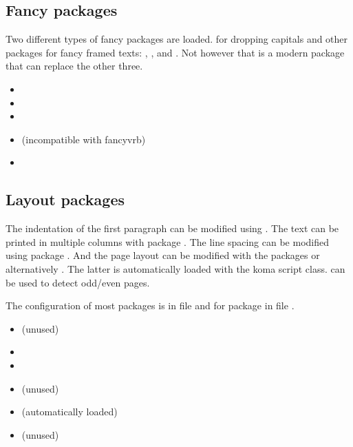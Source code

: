 \subsection{Fancy packages}
\label{sec:packages:fancy}

Two different types of fancy packages are loaded.  for dropping capitals and other packages for fancy framed texts: , ,  and . Not however that  is a modern package that can replace the other three.

\begin{itemize}[noitemsep]
\item {} 
\item {}
\item {}
\item {} (incompatible with fancyvrb)
\item {}
\end{itemize}


\subsection{Layout packages}
\label{sec:packages:layout}

The indentation of the first paragraph can be modified using . The text can be printed in multiple columns with package . The line spacing can be modified using package 
. And the page layout can be modified with the packages  or alternatively . The latter is automatically loaded with the koma script class.  can be used to detect odd/even pages.

The configuration of most packages is in file  and 
for package  in file .


\begin{itemize}[noitemsep]
\item {} (unused)
\item {}
\item {}
\item {} (unused)
\item {} (automatically loaded)
\item {} (unused)
\end{itemize}

